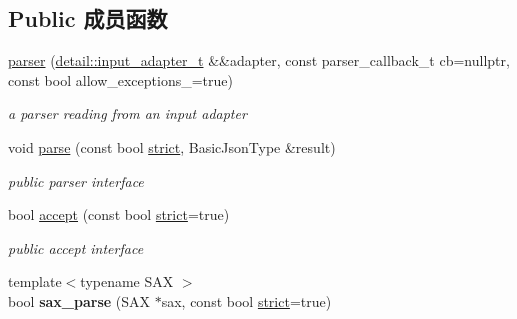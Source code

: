 \subsection*{Public 成员函数}
\begin{DoxyCompactItemize}
\item 
\mbox{\label{classnlohmann_1_1detail_1_1parser_a1a2bd258b7e99f86b7e6a3c41373ba55}} 
\mbox{\hyperlink{classnlohmann_1_1detail_1_1parser_a1a2bd258b7e99f86b7e6a3c41373ba55}{parser}} (\mbox{\hyperlink{namespacenlohmann_1_1detail_ae132f8cd5bb24c5e9b40ad0eafedf1c2}{detail\+::input\+\_\+adapter\+\_\+t}} \&\&adapter, const parser\+\_\+callback\+\_\+t cb=nullptr, const bool allow\+\_\+exceptions\+\_\+=true)
\begin{DoxyCompactList}\small\item\em a parser reading from an input adapter \end{DoxyCompactList}\item 
void \mbox{\hyperlink{classnlohmann_1_1detail_1_1parser_a14338d8f3174601c0b2b7ef28752ab17}{parse}} (const bool \mbox{\hyperlink{namespacenlohmann_1_1detail_a5a76b60b26dc8c47256a996d18d967dfa2133fd717402a7966ee88d06f9e0b792}{strict}}, Basic\+Json\+Type \&result)
\begin{DoxyCompactList}\small\item\em public parser interface \end{DoxyCompactList}\item 
bool \mbox{\hyperlink{classnlohmann_1_1detail_1_1parser_a20997b42262856935b60fc91bf05bf3f}{accept}} (const bool \mbox{\hyperlink{namespacenlohmann_1_1detail_a5a76b60b26dc8c47256a996d18d967dfa2133fd717402a7966ee88d06f9e0b792}{strict}}=true)
\begin{DoxyCompactList}\small\item\em public accept interface \end{DoxyCompactList}\item 
\mbox{\label{classnlohmann_1_1detail_1_1parser_a14e34931965064b26e118eb72cbd5e25}} 
{\footnotesize template$<$typename S\+AX $>$ }\\bool {\bfseries sax\+\_\+parse} (S\+AX $\ast$sax, const bool \mbox{\hyperlink{namespacenlohmann_1_1detail_a5a76b60b26dc8c47256a996d18d967dfa2133fd717402a7966ee88d06f9e0b792}{strict}}=true)
\end{DoxyCompactItemize}



